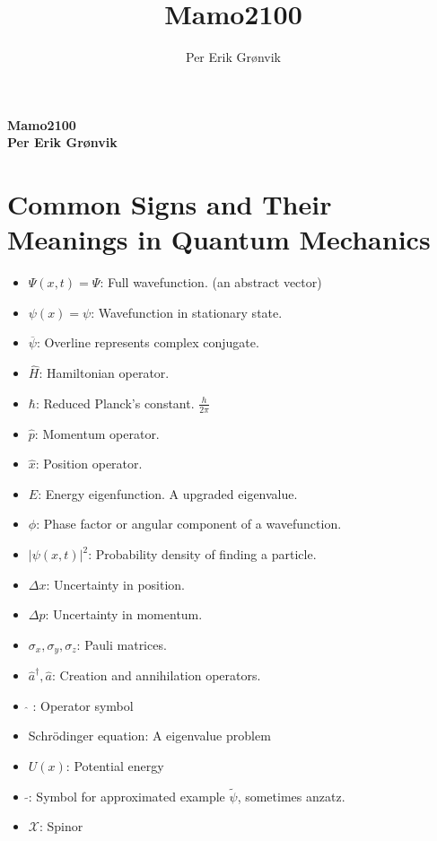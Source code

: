 \documentclass[a4paper,11pt]{article}
\title{Mamo2100}
\author{Per Erik Grønvik} %
\date{}   %
\begin{document}
\vspace{-0.5cm} %

\begin{footnotesize}

\begin{multicols}{2}
\paragraph{\large Mamo2100 \\ \tiny Per Erik Grønvik }


\section*{Common Signs and Their Meanings in Quantum Mechanics}

\begin{itemize}
    \item \( \Psi(x,t) =\Psi \): Full wavefunction. (an abstract vector)
    \item \( \psi(x) =\psi\): Wavefunction in stationary state.
    \item \( \overline{\psi} \): Overline represents complex conjugate.
    \item \( \hat{H} \): Hamiltonian operator.
    \item \( \hbar \): Reduced Planck's constant. $\frac{h}{2\pi}$
    \item \( \hat{p} \): Momentum operator.
    \item \( \hat{x} \): Position operator.
    \item \( E \): Energy eigenfunction. A upgraded eigenvalue.
    \item \( \phi \): Phase factor or angular component of a wavefunction.
    \item \( |\psi(x,t)|^2 \): Probability density of finding a particle.
    \item \( \Delta x \): Uncertainty in position.
    \item \( \Delta p \): Uncertainty in momentum.
    \item \( \sigma_x, \sigma_y, \sigma_z \): Pauli matrices.
    \item \( \hat{a}^\dagger, \hat{a} \): Creation and annihilation operators.
    \item \( \hat{} \)  : Operator symbol
    \item Schrödinger equation: A eigenvalue problem
    \item $U(x)$: Potential energy
    \item $\tilde{}$: Symbol for approximated example $\tilde{\psi}$, sometimes anzatz.
    \item $\mathcal{X}$: Spinor
\end{itemize}



\end{multicols}
\end{footnotesize}
\end{document}
